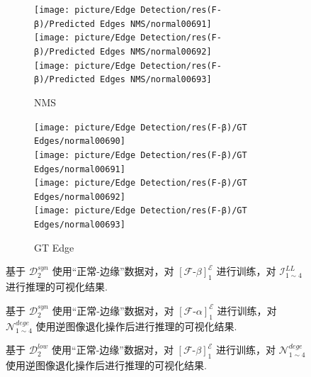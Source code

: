 \documentclass[a4paper]{ctexart}
\begin{document}
\begin{figure}[htbp]
\begin{subfigure}{0.16\textwidth}
				\texttt{[image: picture/Edge Detection/res(F-β)/Predicted Edges NMS/normal00691]} \\
				\texttt{[image: picture/Edge Detection/res(F-β)/Predicted Edges NMS/normal00692]} \\
				\texttt{[image: picture/Edge Detection/res(F-β)/Predicted Edges NMS/normal00693]}
				\caption{NMS}
			\end{subfigure}
			\begin{subfigure}{0.16\textwidth}
				\texttt{[image: picture/Edge Detection/res(F-β)/GT Edges/normal00690]} \\
				\texttt{[image: picture/Edge Detection/res(F-β)/GT Edges/normal00691]} \\
				\texttt{[image: picture/Edge Detection/res(F-β)/GT Edges/normal00692]} \\
				\texttt{[image: picture/Edge Detection/res(F-β)/GT Edges/normal00693]}
				\caption{GT Edge}
			\end{subfigure}
			\caption{基于 $\mathcal{D}^{syn}_{2}$ 使用“正常-边缘”数据对，对 ${\left[\mathcal{F}\text{-}\beta\right]}^{\mathcal{E}}_1$ 进行训练，对 $\mathcal{I}_{1 \sim 4}^{LL}$ 进行推理的可视化结果.}
		\end{figure}
		
		\begin{figure}[htbp]
			\centering
			\caption{基于 $\mathcal{D}^{syn}_{2}$ 使用“正常-边缘”数据对，对 ${\left[\mathcal{F}\text{-}\alpha\right]}^{\mathcal{E}}_1$ 进行训练，对 $\mathcal{N}_{1 \sim 4}^{dege}$ 使用逆图像退化操作后进行推理的可视化结果.}
		\end{figure}
		
		\begin{figure}[htbp]
			\centering
			\caption{基于 $\mathcal{D}^{low}_{2}$ 使用“正常-边缘”数据对，对 ${\left[\mathcal{F}\text{-}\beta\right]}^{\mathcal{E}}_1$ 进行训练，对 $\mathcal{N}_{1 \sim 4}^{dege}$ 使用逆图像退化操作后进行推理的可视化结果.}
		\end{figure}
		
		\renewcommand{\refname}{References}
		
		
			
			
\end{document}
